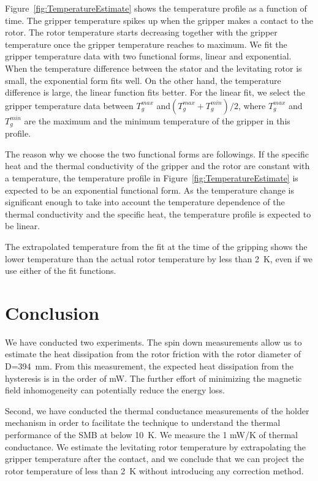 \documentclass[journal]{IEEEtran}
\begin{document}
Figure~\ref{fig:TemperatureEstimate} shows the temperature profile as a function of time.
The gripper temperature spikes up when the gripper makes a contact to the rotor.
The rotor temperature starts decreasing together with the gripper temperature once the gripper temperature reaches to maximum.
We fit the gripper temperature data with two functional forms, linear and exponential.
When the temperature difference between the stator and the levitating rotor is small, the exponential form fits well.
On the other hand, the temperature difference is large, the linear function fits better.
For the linear fit, we select the gripper temperature data between $T_g^{max}$ and$(T_g^{max}+T_g^{min})/2$,
where $T_g^{max}$ and $T_g^{min}$ are the maximum and the minimum temperature of the gripper in this profile.

The reason why we choose the two functional forms are followings.
If the specific heat and the thermal conductivity of the gripper and the rotor are constant with a temperature, the temperature profile in Figure~\ref{fig:TemperatureEstimate} is expected to be an exponential functional form.
As the temperature change is significant enough to take into account the temperature dependence of the thermal conductivity and the specific heat, the temperature profile is expected to be linear. 

The extrapolated temperature from the fit at the time of the gripping shows the lower temperature than the actual rotor temperature by less than 2~K, even if we use either of the fit functions.

\section{Conclusion}
We have conducted two experiments.
The spin down measurements allow us to estimate the heat dissipation from the rotor friction with the rotor diameter of D=394~mm.
From this measurement, the expected heat dissipation from the hysteresis is in the order of mW.
The further effort of minimizing the magnetic field inhomogeneity can potentially reduce the energy loss.

Second, we have conducted the thermal conductance measurements of the holder mechanism in order to facilitate the technique to understand the thermal performance of the SMB at below 10~K.
We measure the 1 mW/K of thermal conductance.
We estimate the levitating rotor temperature by extrapolating the gripper temperature after the contact, and we conclude that we can project the rotor temperature of less than 2~K without introducing any correction method.
\end{document}
